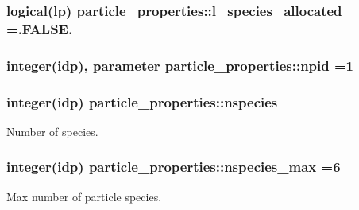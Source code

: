 \subsubsection[{\texorpdfstring{l\+\_\+species\+\_\+allocated}{l_species_allocated}}]{\setlength{\rightskip}{0pt plus 5cm}logical(lp) particle\+\_\+properties\+::l\+\_\+species\+\_\+allocated =.F\+A\+L\+S\+E.}\hypertarget{namespaceparticle__properties_a28560b71636b1cc7340564a08847511f}{}\label{namespaceparticle__properties_a28560b71636b1cc7340564a08847511f}
\subsubsection[{\texorpdfstring{npid}{npid}}]{\setlength{\rightskip}{0pt plus 5cm}integer(idp), parameter particle\+\_\+properties\+::npid =1}\hypertarget{namespaceparticle__properties_a9a2b5f322610353c06693336b21439f7}{}\label{namespaceparticle__properties_a9a2b5f322610353c06693336b21439f7}
\subsubsection[{\texorpdfstring{nspecies}{nspecies}}]{\setlength{\rightskip}{0pt plus 5cm}integer(idp) particle\+\_\+properties\+::nspecies}\hypertarget{namespaceparticle__properties_a5aabee3c3d0e9e902989125d50e03426}{}\label{namespaceparticle__properties_a5aabee3c3d0e9e902989125d50e03426}


Number of species. 

\subsubsection[{\texorpdfstring{nspecies\+\_\+max}{nspecies_max}}]{\setlength{\rightskip}{0pt plus 5cm}integer(idp) particle\+\_\+properties\+::nspecies\+\_\+max =6}\hypertarget{namespaceparticle__properties_a7f6d8f4edc23a026743320958d14d534}{}\label{namespaceparticle__properties_a7f6d8f4edc23a026743320958d14d534}


Max number of particle species. 

